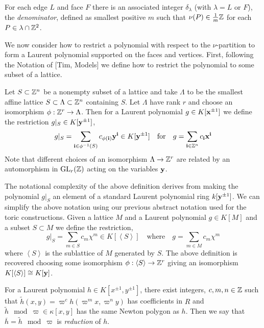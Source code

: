 \documentclass[12pt]{article}
\begin{document}
\begin{defn}
For each edge $L$ and face $F$ there is an associated integer $\delta_\lambda$ (with $\lambda = L$ or $F$), the \textit{denominator}, defined as smallest positive $m$ such that $\nu(P) \in \frac{1}{m} \Z$ for each $P \in \lambda \cap \Z^2$. 
\end{defn}

\begin{rmk}
We now consider how to restrict a polynomial with respect to the $\nu$-partition to form a Laurent polynomial supported on the faces and vertices. First, following the Notation of [Tim, Models] we define how to restrict the polynomial to some subset of a lattice.
\end{rmk}

\begin{defn}[Restriction]
Let $S \subset \Z^n$ be a nonempty subset of a lattice and take $\Lambda$ to be the smallest affine lattice $S \subset \Lambda \subset \Z^n$ containing $S$. Let $\Lambda$ have rank $r$ and choose an isomorphism $\phi : \Z^r \to \Lambda$. Then for a Laurent polynomial $g \in K[\bf{x}^{\pm 1}]$ we define the restriction $g|_S \in K[\bf{y}^{\pm 1}]$,
\[ g|_S = \sum_{\bf{i} \in \phi^{-1}(S)} c_{\phi(\bf{i})} \bf{y}^{\bf{i}} \in K[\bf{y}^{\pm 1}] \quad \text{for} \quad g = \sum_{\bf{i} \in \Z^n} c_{\bf{i}} \bf{x}^{\bf{i}} \]
Note that different choices of an isomorphism $\Lambda \to \Z^r$ are related by an automorphism in $\GL{r}{\Z}$ acting on the variables $\bf{y}$. 
\end{defn}

\begin{rmk}
The notational complexity of the above definition derives from making the polynomial $g|_S$ an element of a standard Laurent polynomial ring $k[\bf{y}^{\pm 1}]$. We can simplify the above notation using our previous abstract notation used for the toric constructions. Given a lattice $M$ and a Laurent polynomial $g \in K[M]$ and a subset $S \subset M$ we define the restriction,
\[ g|_S = \sum_{m \in S} c_m \chi^m \in K[\left< S \right>] \quad \text{where} \quad g = \sum_{m \in M} c_m \chi^m \]
where $\left< S \right>$ is the sublattice of $M$ generated by $S$. The above definition is recovered choosing some isomorphism $\phi : \left< S \right> \to \Z^r$ giving an isomorphism $K[\left< S \right>] \cong K[\bf{y}]$. 
\end{rmk}

\begin{defn}[Reduction]
For a Laurent polynomial $h \in K[x^{\pm 1}, y^{\pm 1}]$, there exist integers, $c, m, n \in \Z$ such that $\tilde{h}(x, y) = \varpi^c h(\varpi^m x, \varpi^n y)$ has coefficients in $R$ and $\tilde{h} \mod \varpi \in \kappa[x, y]$ has the same Newton polygon as $h$. Then we say that $\overline{h} = \tilde{h} \mod \varpi$ is \textit{reduction} of $h$. 
\end{defn}
\end{document}
